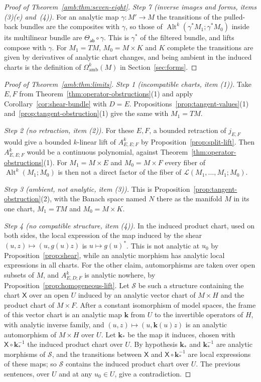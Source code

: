 \documentclass[11pt]{amsart}
\theoremstyle{definition}
\theoremstyle{remark}
\numberwithin{equation}{section}
\newcommand{\cL}{\mathcal L}
\newcommand{\Alt}{\operatorname{Alt}}
\theoremstyle{plain}
\theoremstyle{definition}
\theoremstyle{plain}
\begin{document}
\begin{proof}[Proof of Theorem~\ref{amb:thm:seven-eight}]
\emph{Step 7 (inverse images and forms, items (3)(e) and~(4)).} For an analytic map $\gamma\colon M'\to M$ the transitions of the pulled-back bundles are the composites with $\gamma$, so those of $\Alt^k(\gamma^*M_1;\gamma^*M_0)$ inside its multilinear bundle are $\Theta_{\mathsf{ab}}\circ\gamma$. This is $\gamma^*$ of the filtered bundle, and lifts compose with $\gamma$. For $M_1=TM$, $M_0=M\times K$ and $K$ complete the transitions are given by derivatives of analytic chart changes, and being ambient in the induced charts is the definition of $\Omega^k_{\mathrm{amb}}(M)$ in Section~\ref{sec:forms}.
\end{proof}

\begin{proof}[Proof of Theorem~\ref{amb:thm:limits}]
\emph{Step 1 (incompatible charts, item (1)).} Take $E,F$ from Theorem~\ref{thm:operator-obstructions}(1) and apply Corollary~\ref{cor:shear-bundle} with $D=E$. Propositions~\ref{prop:tangent-values}(1) and~\ref{prop:tangent-obstruction}(1) give the same with $M_1=TM$.

\emph{Step 2 (no retraction, item (2)).} For these $E,F$, a bounded retraction of $j_{E,F}$ would give a bounded $k$\nobreakdash-linear lift of $A^k_{E,E;F}$ by Proposition~\ref{prop:split-lift}. Then $A^k_{E,E;F}$ would be a continuous polynomial, against Theorem~\ref{thm:operator-obstructions}(1). For $M_1=M\times E$ and $M_0=M\times F$ every fiber of $\Alt^k(M_1;M_0)$ is then not a direct factor of the fiber of $\cL(M_1,\dots,M_1;M_0)$.

\emph{Step 3 (ambient, not analytic, item (3)).} This is Proposition~\ref{prop:tangent-obstruction}(2), with the Banach space named $N$ there as the manifold $M$ in its one chart, $M_1=TM$ and $M_0=M\times K$.

\emph{Step 4 (no compatible structure, item (4)).} In the induced product chart, used on both sides, the local expression of the map induced by the shear $(u,z)\mapsto(u,g(u)z)$ is $u\mapsto g(u)^*$. This is not analytic at $u_0$ by Proposition~\ref{prop:shear}, while an analytic morphism has analytic local expressions in all charts. For the other claim, automorphisms are taken over open subsets of $M$, and $A^k_{E,D;F}$ is analytic nowhere, by Proposition~\ref{prop:homogeneous-lift}. Let $\mathcal S$ be such a structure containing the chart $\mathsf X$ over an open $U$ induced by an analytic vector chart of $M\times H$ and the product chart of $M\times F$. After a constant isomorphism of model spaces, the frame of this vector chart is an analytic map $\mathbf k$ from $U$ to the invertible operators of $H$, with analytic inverse family, and $(u,z)\mapsto(u,\mathbf k(u)z)$ is an analytic automorphism of $M\times H$ over $U$. Let $\mathbf k_*$ be the map it induces, chosen with $\mathsf X\circ\mathbf k_*^{-1}$ the induced product chart over $U$. By hypothesis $\mathbf k_*$ and $\mathbf k_*^{-1}$ are analytic morphisms of $\mathcal S$, and the transitions between $\mathsf X$ and $\mathsf X\circ\mathbf k_*^{-1}$ are local expressions of these maps; so $\mathcal S$ contains the induced product chart over $U$. The previous sentences, over $U$ and at any $u_0\in U$, give a contradiction.


\end{proof}
\end{document}

